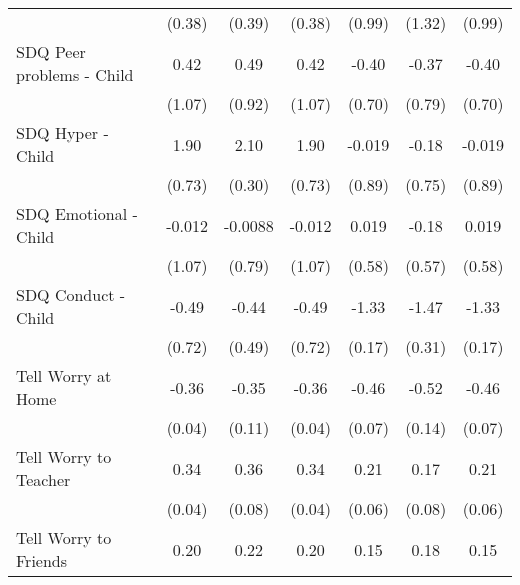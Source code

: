 {\begin{tabular}{l*{6}{c}}
            &      (0.38)         &      (0.39)         &      (0.38)         &      (0.99)         &      (1.32)         &      (0.99)         \\
\addlinespace
SDQ Peer problems - Child&        0.42         &        0.49         &        0.42         &       -0.40         &       -0.37         &       -0.40         \\
            &      (1.07)         &      (0.92)         &      (1.07)         &      (0.70)         &      (0.79)         &      (0.70)         \\
\addlinespace
SDQ Hyper - Child&        1.90\sym{**} &        2.10\sym{***}&        1.90\sym{**} &      -0.019         &       -0.18         &      -0.019         \\
            &      (0.73)         &      (0.30)         &      (0.73)         &      (0.89)         &      (0.75)         &      (0.89)         \\
\addlinespace
SDQ Emotional - Child&      -0.012         &     -0.0088         &      -0.012         &       0.019         &       -0.18         &       0.019         \\
            &      (1.07)         &      (0.79)         &      (1.07)         &      (0.58)         &      (0.57)         &      (0.58)         \\
\addlinespace
SDQ Conduct - Child&       -0.49         &       -0.44         &       -0.49         &       -1.33\sym{***}&       -1.47\sym{***}&       -1.33\sym{***}\\
            &      (0.72)         &      (0.49)         &      (0.72)         &      (0.17)         &      (0.31)         &      (0.17)         \\
\addlinespace
Tell Worry at Home&       -0.36\sym{***}&       -0.35\sym{**} &       -0.36\sym{***}&       -0.46\sym{***}&       -0.52\sym{***}&       -0.46\sym{***}\\
            &      (0.04)         &      (0.11)         &      (0.04)         &      (0.07)         &      (0.14)         &      (0.07)         \\
\addlinespace
Tell Worry to Teacher&        0.34\sym{***}&        0.36\sym{***}&        0.34\sym{***}&        0.21\sym{***}&        0.17\sym{*}  &        0.21\sym{***}\\
            &      (0.04)         &      (0.08)         &      (0.04)         &      (0.06)         &      (0.08)         &      (0.06)         \\
\addlinespace
Tell Worry to Friends&        0.20\sym{***}&        0.22\sym{***}&        0.20\sym{***}&        0.15\sym{**} &        0.18\sym{*}  &        0.15\sym{**} \\

\end{tabular}}
